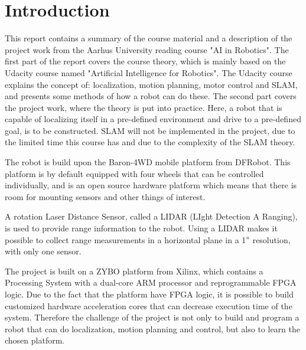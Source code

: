 \documentclass[Main]{subfiles}
\begin{document}
\part*{Introduction} %
\label{cha:introduction}

	This report contains a summary of the course material and a description of the project work from the Aarhus University reading course "AI in Robotics".
	The first part of the report covers the course theory, which is mainly based on the Udacity course named "Artificial Intelligence for Robotics".
	The Udacity course explains the concept of: localization, motion planning, motor control and SLAM, and presents some methods of how a robot can do these.
	The second part covers the project work, where the theory is put into practice.
	Here, a robot that is capable of localizing itself in a pre-defined environment and drive to a pre-defined goal, is to be constructed.
	SLAM will not be implemented in the project, due to the limited time this course has and due to the complexity of the SLAM theory.

	The robot is build upon the Baron-4WD mobile platform from DFRobot.
	This platform is by default equipped with four wheels that can be controlled individually, and is an open source hardware platform which means that there is room for mounting sensors and other things of interest.

	A rotation Laser Distance Sensor, called a LIDAR (LIght Detection A Ranging), is used to provide range information to the robot.
	Using a LIDAR makes it possible to collect range measurements in a horizontal plane in a 1$\degree$ resolution, with only one sensor.

	The project is built on a ZYBO platform from Xilinx, which contains a Processing System with a dual-core ARM processor and reprogrammable FPGA logic.
	Due to the fact that the platform have FPGA logic, it is possible to build customized hardware acceleration cores that can decrease execution time of the system.
	Therefore the challenge of the project is not only to build and program a robot that can do localization, motion planning and control, but also to learn the chosen platform.

\end{document}
